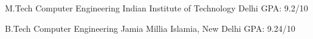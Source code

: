     {M.Tech}
    {Computer Engineering}
    {Indian Institute of Technology Delhi}
    {GPA: 9.2/10}
    {}

    {B.Tech}
    {Computer Engineering}
    {Jamia Millia Islamia, New Delhi}
    {GPA: 9.24/10}
    {}



